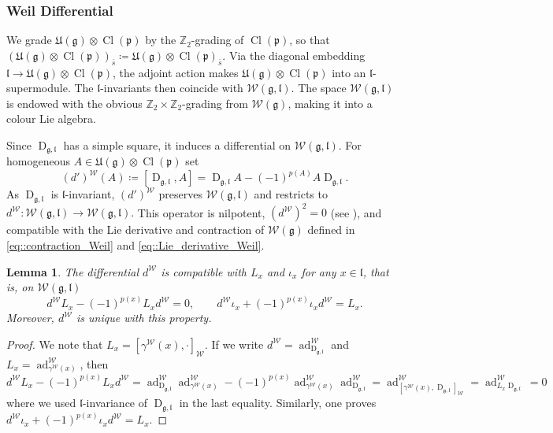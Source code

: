 \documentclass[11pt]{amsart}
\newcommand{\ad}{\operatorname{ad}}
\newcommand{\Dirac}{\operatorname{D}}
\def\WW{{\mathcal{W}}}
\def\Weil{{\mathcal{W}(\gg)}}
\def\Cl{{\operatorname{Cl}}}
\def\pp{{\mathfrak p}}
\def\ll{{\mathfrak l}}
\def\pp{{\mathfrak p}}
\def\pp{{\mathfrak{p}}}
\def\gg{{\mathfrak{g}}}
\def\ZZ{{\mathbb Z}}
\theoremstyle{plain}
\newtheorem{lemma}[theorem]{Lemma}
\theoremstyle{remark}
\theoremstyle{definition}
\numberwithin{equation}{section}
\theoremstyle{remark}
\begin{document}
\subsubsection{Weil Differential}\label{subsubsec::Weil_differential} We grade $\mathfrak{U}(\gg)\otimes \Cl(\pp)$ by the $\ZZ_{2}$-grading of $\Cl(\pp)$,
so that $(\mathfrak{U}(\gg)\otimes \Cl(\pp))_{\bar s}\coloneqq \mathfrak{U}(\gg)\otimes \Cl(\pp)_{\bar s}$. Via the diagonal embedding
$\ll\to \mathfrak{U}(\gg)\otimes \Cl(\pp)$, the adjoint action makes $\mathfrak{U}(\gg)\otimes \Cl(\pp)$ into an
$\ll$-supermodule. The $\ll$-invariants then coincide with $\WW(\gg,\ll)$. The space $\WW(\gg,\ll)$ is endowed with the obvious $\ZZ_{2}\times \ZZ_{2}$-grading from $\Weil$, making it into a colour Lie algebra.

Since $\Dirac_{\gg,\ll}$ has a simple square, it induces a differential on $\WW(\gg,\ll)$. For homogeneous
$A\in \mathfrak{U}(\gg)\otimes \Cl(\pp)$ set
\begin{equation}
 (d')^{\WW}(A)\coloneqq [\Dirac_{\gg,\ll},A]
=\Dirac_{\gg,\ll}A-(-1)^{p(A)}A\Dirac_{\gg,\ll}.
\end{equation}
As $\Dirac_{\gg,\ll}$ is $\ll$-invariant, $(d')^{\WW}$ preserves $\WW(\gg,\ll)$ and restricts to
$ d^{\WW}:\WW(\gg,\ll)\to \WW(\gg,\ll).
$ This operator is nilpotent, $(d^{\WW})^{2}=0$ (see \cite{Chen_Dirac_quadratic}), and compatible with the Lie derivative and contraction of $\Weil$ defined in \eqref{eq::contraction_Weil} and \eqref{eq::Lie_derivative_Weil}.

\begin{lemma} \label{lemm::properties_Weil_differential}
 The differential $d^{\WW}$ is compatible with $L_{x}$ and $\iota_{x}$ for any $x \in \ll$, that is, on $\WW(\gg,\ll)$ 
 \[
 d^{\mathcal{W}}L_{x}-(-1)^{p(x)}L_{x}d^{\mathcal{W}}=0, \qquad d^{\WW}\iota_{x}+(-1)^{p(x)}\iota_{x}d^{\WW}=L_{x}.
 \]
 Moreover, $d^{\mathcal{W}}$ is unique with this property.
\end{lemma}
\begin{proof}
We note that $L_{x}=[\gamma^{\WW}(x),\cdot]_{\WW}$. If we write $d^{\WW}=\ad_{\Dirac_{\gg,\ll}}^{\WW}$ and $L_{x}=\ad_{\gamma^{\WW}(x)}^{\WW}$, then 
\[
d^{\WW}L_{x}-(-1)^{p(x)}L_{x}d^{\WW}=\ad^{\WW}_{\Dirac_{\gg,\ll}}\ad^{\WW}_{\gamma^{\WW}(x)}-(-1)^{p(x)}\ad^{\WW}_{\gamma^{\WW}(x)}\ad^{\WW}_{\Dirac_{\gg,\ll}}=\ad^{\WW}_{[\gamma^{\WW}(x),\Dirac_{\gg,\ll}]_{\WW}}=\ad^{\WW}_{L_{x}\Dirac_{\gg,\ll}}=0
\]
where we used $\ll$-invariance of $\Dirac_{\gg,\ll}$ in the last equality. Similarly, one proves $d^{\WW}\iota_{x}+(-1)^{p(x)}\iota_{x}d^{\WW}=L_{x}.$
\end{proof}
\end{document}

